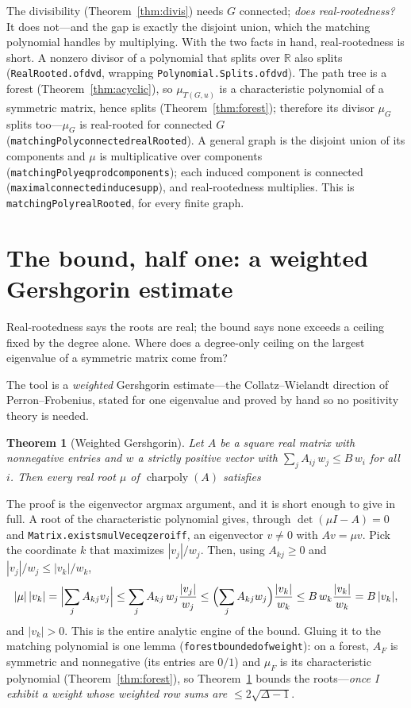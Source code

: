 \documentclass[11pt]{article}
\newtheorem{theorem}{Theorem}
\newcommand{\lean}[1]{{\def\_{\textunderscore\allowbreak}\texttt{#1}}}
\newcommand{\R}{\mathbb{R}}
\newcommand{\keyeq}[1]{\begin{center}\keybox{$\displaystyle #1$}\end{center}}
\begin{document}
The divisibility (Theorem~\ref{thm:divis}) needs $G$ connected; \emph{does
real-rootedness?} It does not---and the gap is exactly the disjoint union, which
the matching polynomial handles by multiplying. With the two facts in hand,
real-rootedness is short. A nonzero divisor of a polynomial that splits over $\R$
also splits (\lean{RealRooted.of\_dvd}, wrapping
\lean{Polynomial.Splits.of\_dvd}). The path tree is a forest
(Theorem~\ref{thm:acyclic}), so $\mu_{T(G,u)}$ is a characteristic polynomial of a
symmetric matrix, hence splits (Theorem~\ref{thm:forest}); therefore its divisor
$\mu_G$ splits too---$\mu_G$ is real-rooted for connected $G$
(\lean{matchingPoly\_connected\_realRooted}). A general graph is the disjoint union
of its components and $\mu$ is multiplicative over components
(\lean{matchingPoly\_eq\_prod\_components}); each induced component is connected
(\lean{maximal\_connected\_induce\_supp}), and real-rootedness multiplies. This is
\lean{matchingPoly\_realRooted}, for every finite graph.

\section{The bound, half one: a weighted Gershgorin estimate}
\label{sec:gershgorin}

Real-rootedness says the roots are real; the bound says none exceeds a ceiling
fixed by the degree alone. Where does a degree-only ceiling on the largest
eigenvalue of a symmetric matrix come from?

The tool is a \emph{weighted} Gershgorin estimate---the Collatz--Wielandt
direction of Perron--Frobenius, stated for one eigenvalue and proved by hand so no
positivity theory is needed.

\begin{theorem}[Weighted Gershgorin]
\label{thm:cw}
Let $A$ be a square real matrix with nonnegative entries and $w$ a strictly
positive vector with $\sum_j A_{ij}\,w_j\le B\,w_i$ for all $i$. Then every real
root $\mu$ of $\operatorname{charpoly}(A)$ satisfies
\keyeq{|\mu|\;\le\;B\qquad(\lean{collatzWielandt}).}
\end{theorem}

The proof is the eigenvector argmax argument, and it is short enough to give in
full. A root of the characteristic polynomial gives, through $\det(\mu I-A)=0$ and
\lean{Matrix.exists\_mulVec\_eq\_zero\_iff}, an eigenvector $v\ne0$ with $Av=\mu
v$. Pick the coordinate $k$ that maximizes $|v_j|/w_j$. Then, using $A_{kj}\ge0$
and $|v_j|/w_j\le|v_k|/w_k$,
\[
  |\mu|\,|v_k|
  =\Bigl|\sum_j A_{kj}v_j\Bigr|
  \le\sum_j A_{kj}\,w_j\frac{|v_j|}{w_j}
  \le\Bigl(\sum_j A_{kj}w_j\Bigr)\frac{|v_k|}{w_k}
  \le B\,w_k\frac{|v_k|}{w_k}=B\,|v_k|,
\]
and $|v_k|>0$. This is the entire analytic engine of the bound. Gluing it to the
matching polynomial is one lemma (\lean{forest\_bounded\_of\_weight}): on a forest,
$A_F$ is symmetric and nonnegative (its entries are $0/1$) and $\mu_F$ is its
characteristic polynomial (Theorem~\ref{thm:forest}), so Theorem~\ref{thm:cw}
bounds the roots---\emph{once I exhibit a weight whose weighted row sums are
$\le 2\sqrt{\Delta-1}$}.
\end{document}

